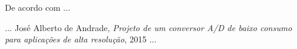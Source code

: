 De acordo com \cite{andrade2015}...
\begin{thebibliography}{99}
...
 José Alberto de Andrade, \emph{Projeto de um conversor A/D de baixo consumo para aplicações de alta resolução}, 2015
...
\end{thebibliography}
